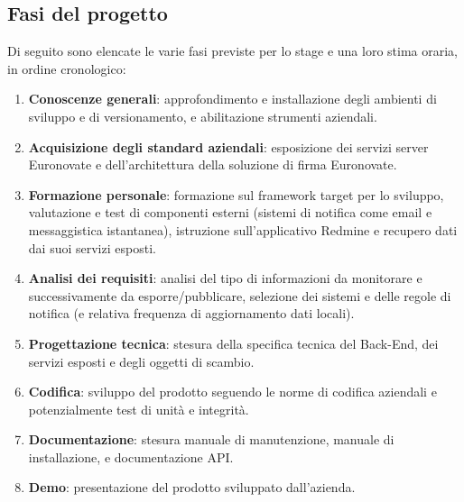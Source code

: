 	\subsection{Fasi del progetto}
		Di seguito sono elencate le varie fasi previste per lo stage e una loro stima oraria, in ordine cronologico:
		\begin{enumerate}
			\item \textbf{Conoscenze generali}: approfondimento e installazione degli ambienti di sviluppo e di versionamento, e abilitazione strumenti aziendali. 
			\item \textbf{Acquisizione degli standard aziendali}: esposizione dei servizi server Euronovate e dell'architettura della soluzione di firma Euronovate. 
			\item \textbf{Formazione personale}: formazione sul framework target per lo sviluppo, valutazione e test di componenti esterni (sistemi di notifica come email e messaggistica istantanea), istruzione sull'applicativo Redmine e recupero dati dai suoi servizi esposti.
			\item \textbf{Analisi dei requisiti}: analisi del tipo di informazioni da monitorare e successivamente da esporre/pubblicare, selezione dei sistemi e delle regole di notifica (e relativa frequenza di aggiornamento dati locali).
			\item \textbf{Progettazione tecnica}: stesura della specifica tecnica del Back-End, dei servizi esposti e degli oggetti di scambio.
			\item \textbf{Codifica}: sviluppo del prodotto seguendo le norme di codifica aziendali e potenzialmente test di unità e integrità.
			\item \textbf{Documentazione}: stesura manuale di manutenzione, manuale di installazione, e documentazione API.
			\item \textbf{Demo}: presentazione del prodotto sviluppato dall'azienda. 
		\end{enumerate}
